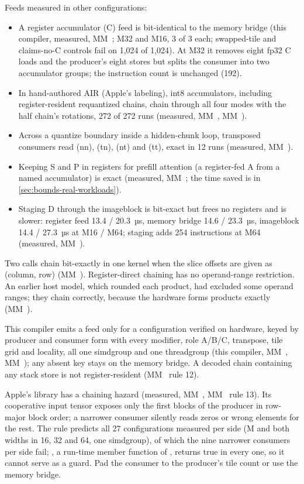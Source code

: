 Feeds measured in other configurations:

\begin{itemize}
\item A register accumulator (C) feed is bit-identical to the memory bridge (this compiler, measured,
  MM~; M32 and M16, 3 of 3 each; swapped-tile and claims-no-C controls fail on 1,024 of 1,024). At M32 it removes
  eight fp32 C loads and the producer's eight stores but splits the consumer into two accumulator groups; the
  instruction count is unchanged (192).
\item In hand-authored AIR (Apple's labeling), int8 accumulators, including register-resident requantized
  chains, chain through all four modes with the half chain's rotations, 272 of 272 runs (measured, MM~, MM~).
\item Across a quantize boundary inside a hidden-chunk loop, transposed consumers read  (nn), 
  (tn),  (nt) and  (tt), exact in 12 runs (measured, MM~).
\item Keeping S and P in registers for prefill attention (a register-fed A from a named accumulator) is exact (measured,
  MM~; the time saved is in \cref{sec:bounds-real-workloads}).
\item Staging D through the imageblock is bit-exact but frees no registers and is slower: register feed 13.4 / 20.3~µs,
  memory bridge 14.6 / 23.3~µs, imageblock 14.4 / 27.3~µs at M16 / M64; staging adds 254 instructions at M64
  (measured, MM~).
\end{itemize}

Two  calls chain bit-exactly in one kernel when the slice offsets are given as (column, row)
(MM~). Register-direct chaining has no operand-range restriction. An earlier host model, which rounded each
product, had excluded some operand ranges; they chain correctly, because the hardware forms products exactly
(MM~).

This compiler emits a feed only for a configuration verified on hardware, keyed by
producer and consumer form with every modifier, role A/B/C, transpose, tile grid and locality, all one simdgroup and
one threadgroup (this compiler, MM~, MM~); any absent key stays on the memory bridge. A decoded chain containing any stack store is not
register-resident (MM~ rule 12).

Apple's library has a chaining hazard (measured, MM~, MM~ rule 13). Its cooperative input tensor exposes only the
first  blocks of the producer in row-major block order; a narrower consumer silently reads
zeros or wrong elements for the rest. The rule predicts all 27 configurations measured per side (M and both widths in 16, 32
and 64, one simdgroup), of which the nine narrower consumers per side fail; , a run-time
member function of , returns true in every one, so it cannot serve as a guard. Pad the consumer to the producer's tile count or use the memory bridge.

